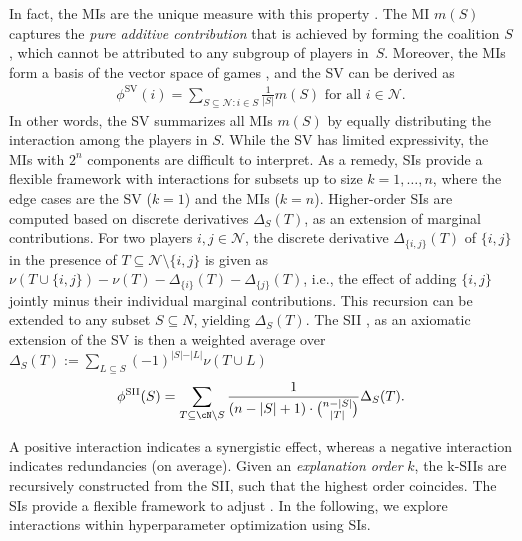 In fact, the \glspl*{MI} are the unique measure with this property \citep{harsanyi1963simplified}.
The \gls*{MI} $m(S)$ captures the \emph{pure additive contribution} that is achieved by forming the coalition $S$, which cannot be attributed to any subgroup of players in~$S$.
Moreover, the \glspl*{MI} form a basis of the vector space of games \citep{Grabisch.2016}, and the \gls*{SV} can be derived as
\begin{align*}
    \phi^{\text{SV}}(i) = \sum_{S \subseteq \mathcal{N}: i \in S} \frac{1}{\vert S \vert} m(S) \text{ for all } i \in \mathcal{N}.
\end{align*}
In other words, the \gls*{SV} summarizes all \glspl*{MI} $m(S)$ by equally distributing the interaction among the players in $S$.
While the \gls*{SV} has limited expressivity, the \glspl*{MI} with $2^n$ components are difficult to interpret.
As a remedy, \glspl*{SI} provide a flexible framework with interactions for subsets up to size $k=1,\dots,n$, where the edge cases are the \gls*{SV} ($k=1$) and the \glspl*{MI} ($k=n$).
Higher-order \glspl*{SI} are computed based on discrete derivatives $\Delta_S(T)$, as an extension of marginal contributions.
For two players $i,j \in \mathcal{N}$, the discrete derivative $\Delta_{\{i,j\}}(T)$ of $\{i,j\}$ in the presence of $T \subseteq \mathcal{N}\setminus \{i,j\}$ is given as $\nu(T \cup \{i,j\}) - \nu(T) - \Delta_{\{i\}}(T) - \Delta_{\{j\}}(T)$, i.e., the effect of adding $\{i,j\}$ jointly minus their individual marginal contributions.
This recursion can be extended to any subset $S \subseteq N$, yielding $\Delta_S(T)$.
The \gls*{SII} \citep{Grabisch.1999}, as an axiomatic extension of the \gls*{SV}  is then a weighted average over $\Delta_S(T) := \sum_{L \subseteq S}(-1)^{\vert S \vert - \vert L \vert} \nu(T \cup L)$
\[
    \phi^{\text{SII}}(S) = \sum_{T \subseteq \cN \setminus S } \frac{1}{(n - \vert S \vert +1) \cdot \binom{n - \vert S \vert}{\vert T \vert }} \Delta_S(T).    
\]



A positive interaction indicates a synergistic effect, whereas a negative interaction indicates redundancies (on average).
Given an \emph{explanation order} $k$, the \glspl*{k-SII} \citep{Lundberg.2020,Bord.2023}\edit{,} are recursively constructed from the \gls*{SII}, such that the highest order coincides.
The \glspl*{SI} provide a flexible framework to adjust  \citep{Tsai.2022,DBLP:conf/icml/FumagalliMKHH24}.
In the following, we explore interactions within hyperparameter optimization using \glspl*{SI}.





